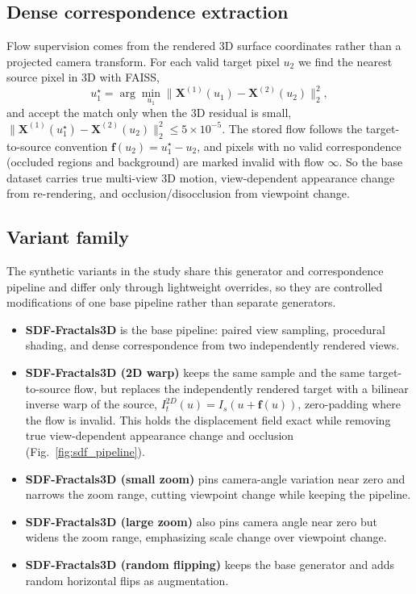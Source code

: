 \documentclass[runningheads]{llncs}
\begin{document}
\subsection{Dense correspondence extraction}
Flow supervision comes from the rendered 3D surface coordinates rather than a
projected camera transform. For each valid target pixel $u_2$ we find the nearest
source pixel in 3D with FAISS,
\begin{equation}
u_1^\star = \arg\min_{u_1}\big\|\mathbf{X}^{(1)}(u_1) - \mathbf{X}^{(2)}(u_2)\big\|_2^2,
\end{equation}
and accept the match only when the 3D residual is small,
$\|\mathbf{X}^{(1)}(u_1^\star)-\mathbf{X}^{(2)}(u_2)\|_2^2 \le 5\times10^{-5}$. The
stored flow follows the target-to-source convention $\mathbf{f}(u_2) = u_1^\star - u_2$,
and pixels with no valid correspondence (occluded regions and background) are marked
invalid with flow $\infty$. So the base dataset carries true multi-view 3D motion,
view-dependent appearance change from re-rendering, and occlusion/disocclusion from
viewpoint change.

\subsection{Variant family}
The synthetic variants in the study share this generator and correspondence pipeline
and differ only through lightweight overrides, so they are controlled modifications of
one base pipeline rather than separate generators.
\begin{itemize}
\item \textbf{SDF-Fractals3D} is the base pipeline: paired view sampling, procedural
shading, and dense correspondence from two independently rendered views.
\item \textbf{SDF-Fractals3D (2D warp)} keeps the same sample and the same
target-to-source flow, but replaces the independently rendered target with a bilinear
inverse warp of the source, $I_t^{2D}(u) = I_s(u + \mathbf{f}(u))$, zero-padding where
the flow is invalid. This holds the displacement field exact while removing true
view-dependent appearance change and occlusion (Fig.~\ref{fig:sdf_pipeline}).
\item \textbf{SDF-Fractals3D (small zoom)} pins camera-angle variation near zero and
narrows the zoom range, cutting viewpoint change while keeping the pipeline.
\item \textbf{SDF-Fractals3D (large zoom)} also pins camera angle near zero but widens
the zoom range, emphasizing scale change over viewpoint change.
\item \textbf{SDF-Fractals3D (random flipping)} keeps the base generator and adds
random horizontal flips as augmentation.
\end{itemize}
\end{document}
